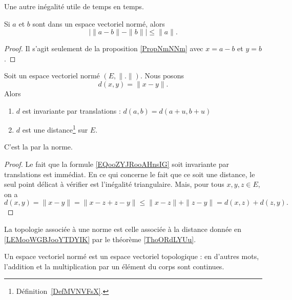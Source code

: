 Une autre inégalité utile de temps en temps.
\begin{corollary}       \label{CORooDFBGooAqVRfS}
	Si \( a\) et \( b\) sont dans un espace vectoriel normé, alors
	\begin{equation}
		\big| \| a-b \|-\| b \| \big|\leq \| a \|.
	\end{equation}
\end{corollary}

\begin{proof}
	Il s'agit seulement de la proposition \ref{PropNmNNm} avec \( x=a-b\) et \( y=b\).
\end{proof}

\begin{lemmaDef}        \label{LEMooWGBJooYTDYIK}
	Soit un espace vectoriel normé \( (E,\| . \|)\). Nous posons
	\begin{equation}        \label{EQooZYJRooAHnsIG}
		d(x,y)=\| x-y \| .
	\end{equation}
	Alors
	\begin{enumerate}
		\item       \label{ITEMooLITDooPeReOk}
		      \( d\) est invariante par translations : \( d(a,b)=d(a+u,b+u)\)
		\item
		      \( d\) est une distance\footnote{Définition~\ref{DefMVNVFsX}.} sur \( E\).
	\end{enumerate}
	C'est la  par la norme.
\end{lemmaDef}

\begin{proof}
	Le fait que la formule \eqref{EQooZYJRooAHnsIG} soit invariante par translations est immédiat. En ce qui concerne le fait que ce soit une distance, le seul point délicat à vérifier est l'inégalité triangulaire. Mais, pour tous \( x, y, z \in E\), on a
	\begin{equation}
		d(x,y)=\| x-y \| = \| x-z+z-y \|  \leq\| x - z \|+\| z - y\| =d(x,z)+d(z,y).
	\end{equation}
\end{proof}

\begin{definition}      \label{DEFooPMVFooPSYVNQ}
	La topologie associée à une norme est celle associée à la distance donnée en \ref{LEMooWGBJooYTDYIK} par le théorème \ref{ThoORdLYUu}.
\end{definition}

\begin{corollary}       \label{CORooMWCUooKyoyZV}
	Un espace vectoriel normé est un espace vectoriel topologique : en d'autres mots, l'addition et la multiplication par un élément du corps sont continues.
\end{corollary}

